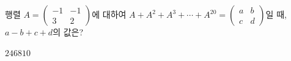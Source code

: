 \hspace*{2mm}\begin{minipage}[t]{\dimexpr\linewidth-2mm\relax}\vspace{0pt}
행렬 $A=\begin{pmatrix} -1 & -1 \\ 3 & 2 \end{pmatrix}$에 대하여 $A+A^2+A^3+\cdots+A^{20}=\begin{pmatrix} a & b \\ c & d \end{pmatrix}$일 때, $a-b+c+d$의 값은?
\begin{choices32}{$2$}{$4$}{$6$}{$8$}{$10$}\end{choices32}\end{minipage}
